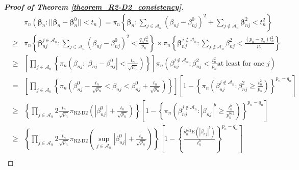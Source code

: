\documentclass[12pt]{article}
\begin{document}
\begin{proof} [\textbf{Proof of Theorem \ref{theorem_R2-D2_consistency}}]
	{\small \begin{eqnarray*}\label{6}
		&& 	\pi_n( \bm\beta_n:|| \bm\beta_n- \bm\beta^0_n|| < t_n) =
		\pi_n\left\{ \bm\beta_n: \sum\limits_{j\in \mathcal{A}_n } (\beta_{nj}-\beta_{nj}^0)^2 + \sum\limits_{j\not\in \mathcal{A}_n}\bm\beta_{n j}^2 < t_n^2\right\} \nonumber \\
		&\geq&
		\pi_n\left\{\bm\beta_{nj}^{j\in\mathcal{A}_n}: \sum\limits_{j\in \mathcal{A}_n }  (\beta_{nj}-\beta_{nj}^0)^2 <\frac{q_n t_n^2}{{p_n} }\right\} \times
		\pi_n\left\{\bm\beta_{nj}^{j\not\in\mathcal{A}_n} : \sum\limits_{j\not\in \mathcal{A}_n}
		\beta_{nj}^2 < \frac{(p_n-q_n)t_n^2}{p_n } \right\}  \nonumber \\
		&\geq&
		\left[\prod\limits_{j\in\mathcal{A}_n} \left\{ \pi_n\left( \beta_{nj}:   |\beta_{nj}-\beta_{nj}^0| <\frac{t_n}{{\sqrt{p_n}}}\right)\right\}  \right]
		\pi_n\left(\beta_{nj}^{j\not\in\mathcal{A}_n} :  \beta_{nj}^2 < \frac{ t_n^2}{p_n }   \text{at least for one $j$} \right)     \nonumber \\
		&= & \left[ \prod\limits_{j\in\mathcal{A}_n} \left\{ \pi_n\left( \beta_{nj}^0 -\frac{t_n}{{\sqrt{p_n}} } <   \beta_{nj} < \beta_{nj}^0 +\frac{t_n}{{\sqrt{p_n}} }\right)\right\}  \right]
	 \left[  1 - \left\{ \pi_n\left(\beta_{nj}^{j\not\in\mathcal{A}_n} :
		\beta_{nj}^2 \geq  \frac{ t_n^2}{p_n } \right) \right\}^{p_n-q_n} \right]\nonumber \\
				&\geq & \left\{\prod\limits_{j\in\mathcal{A}_n}
				2\frac{t_n}{{\sqrt{p_n}}} \pi_{\text{R2-D2}} \left(   |\beta_{nj}^0| + \frac{t_n}{{\sqrt{p_n}}} \right) \right\}
				 \left[  1 - 	\left\{ \pi_n\left(\beta_{nj}^{j\not\in\mathcal{A}_n} :
				|\beta_{nj}|^b \geq \frac{ t_n^b}{p_n^{b/2} } \right)\right\}^{p_n-q_n} \right] \nonumber \\
					&\geq & \left\{\prod\limits_{j\in\mathcal{A}_n}
				2\frac{t_n}{{\sqrt{p_n}}} \pi_{\text{R2-D2}} \left(    \sup_{j\in\mathcal{A}_n} |\beta_{nj}^0| + \frac{t_n}{{\sqrt{p_n}}} \right) \right\}
				\left[1- 	\left\{    \frac{p_n^{b/2}   \text{E}( |\beta_{nj}|^b)}{ t_n^b} \right\}^{p_n-q_n}  \right ]\nonumber \\

\end{eqnarray*}}
\end{proof}
\end{document}
